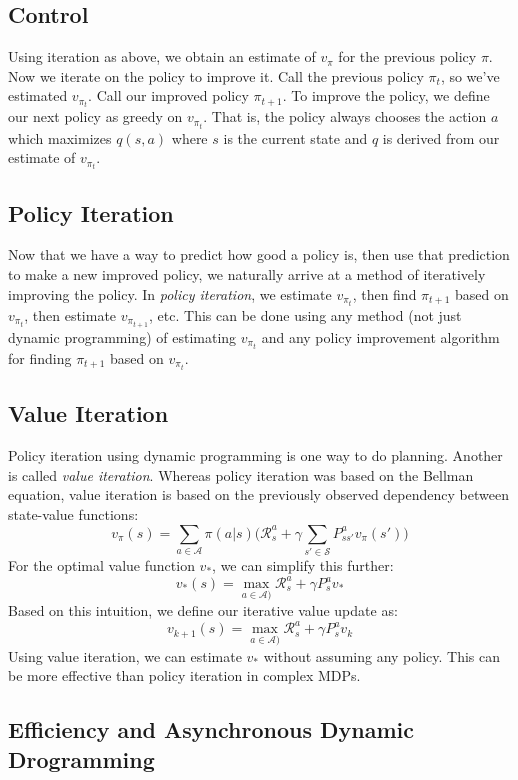 \documentclass{article}
\newcommand{\ita}{\textit}
\begin{document}
\subsection{Control}

Using iteration as above, we obtain an estimate of $v_\pi$ for the previous policy $\pi$. Now we iterate on the policy to improve it. Call the previous policy $\pi_t$, so we've estimated $v_{\pi_t}$. Call our improved policy $\pi_{t+1}$. To improve the policy, we define our next policy as greedy on $v_{\pi_t}$. That is, the policy always chooses the action $a$ which maximizes $q(s, a)$ where $s$ is the current state and $q$ is derived from our estimate of $v_{\pi_t}$.

\subsection{Policy Iteration}

Now that we have a way to predict how good a policy is, then use that prediction to make a new improved policy, we naturally arrive at a method of iteratively improving the policy. In \ita{policy iteration}, we estimate $v_{\pi_t}$, then find $\pi_{t+1}$ based on $v_{\pi_t}$, then estimate $v_{\pi_{t+1}}$, etc. This can be done using any method (not just dynamic programming) of estimating $v_{\pi_t}$ and any policy improvement algorithm for finding $\pi_{t+1}$ based on $v_{\pi_t}$.

\subsection{Value Iteration}

Policy iteration using dynamic programming is one way to do planning. Another is called \ita{value iteration}. Whereas policy iteration was based on the Bellman equation, value iteration is based on the previously observed dependency between state-value functions:
$$v_\pi(s) = \sum_{a\in\mathcal{A}} \pi(a|s)\bigg(\mathcal{R}^a_s + \gamma\sum_{s'\in\mathcal{S}}P^a_{ss'}v_\pi(s')\bigg)$$
For the optimal value function $v_*$, we can simplify this further:
$$v_*(s) = \max_{a\in\mathcal{A})} \mathcal{R}^a_s + \gamma P^a_s v_*$$
Based on this intuition, we define our iterative value update as:
$$v_{k+1}(s) = \max_{a\in\mathcal{A})} \mathcal{R}^a_s + \gamma P^a_s v_k$$
Using value iteration, we can estimate $v_*$ without assuming any policy. This can be more effective than policy iteration in complex MDPs.

\subsection{Efficiency and Asynchronous Dynamic Drogramming}
\end{document}
